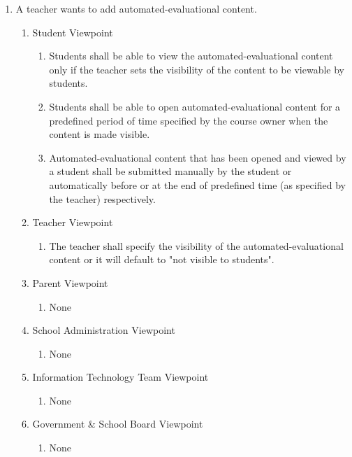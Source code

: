 \documentclass[]{article}
\begin{document}
\begin{enumerate}[{BE}1.]
	\item A teacher wants to add automated-evaluational content.
	\begin{enumerate}[{VP2}.1]

		\item Student Viewpoint
			\begin{enumerate}
        \item Students shall be able to view the automated-evaluational content
          only if the teacher sets the visibility of the content to be viewable
          by students.

        \item Students shall be able to open automated-evaluational content for
          a predefined period of time specified by the course owner when the
          content is made visible.

        \item Automated-evaluational content that has been opened and viewed by
          a student shall be submitted manually by the student or automatically
          before or at the end of predefined time (as specified by the teacher)
          respectively.
			\end{enumerate}

		\item Teacher Viewpoint
			\begin{enumerate}
        \item The teacher shall specify the visibility of the
          automated-evaluational content or it will default to "not visible to
          students".
			\end{enumerate}

		\item Parent Viewpoint
			\begin{enumerate}
				\item None
			\end{enumerate}

		\item School Administration Viewpoint
			\begin{enumerate}
				\item None
			\end{enumerate}

		\item Information Technology Team Viewpoint
			\begin{enumerate}
				\item None
			\end{enumerate}

		\item Government \& School Board Viewpoint
			\begin{enumerate}
				\item None
			\end{enumerate}


\end{enumerate}
\end{enumerate}
\end{document}
